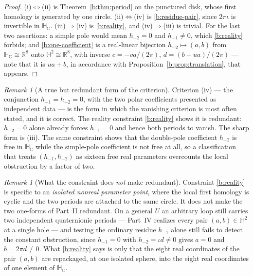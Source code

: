 \documentclass[11pt,a4paper]{article}
\numberwithin{equation}{section}
\theoremstyle{definition}
\theoremstyle{remark}
\newtheorem{remark}[theorem]{Remark}
\theoremstyle{plain}
\newcommand{\HH}{\mathbb H}
\newcommand{\HC}{\mathbb H_{\mathbb C}}
\newcommand{\RR}{\mathbb R}
\begin{document}
\begin{proof}
(i)$\Leftrightarrow$(ii) is Theorem~\ref{b:thm:period} on the punctured disk,
whose first homology is generated by one circle.  (ii)$\Leftrightarrow$(iv)
is \eqref{b:residue-pair}, since $2\pi\iota$ is invertible in $\HC$.
(iii)$\Rightarrow$(iv) is \eqref{b:reality}, and (iv)$\Rightarrow$(iii) is
trivial.  For the last two assertions: a simple pole would mean $h_{-2}=0$ and
$h_{-1}\ne0$, which \eqref{b:reality} forbids; and \eqref{b:one-coefficient}
is a real-linear bijection $h_{-2}\mapsto(a,b)$ from $\HC\cong\RR^8$ onto
$\HH^2\cong\RR^8$, with inverse $c=-va/(2\pi)$,
$d=(b+ua)/(2\pi)$ --- note that it is $ua+b$, in accordance with
Proposition~\ref{b:prop:translation}, that appears.
\end{proof}

\begin{remark}[A true but redundant form of the criterion]
\label{b:rem:redundant}
Criterion (iv) --- the conjunction $h_{-1}=h_{-2}=0$, with the two polar
coefficients presented as independent data --- is the form in which the
vanishing criterion is most often stated, and it is correct.  The reality
constraint \eqref{b:reality} shows it is redundant: $h_{-2}=0$ alone already
forces $h_{-1}=0$ and hence both periods to vanish.  The sharp form is (iii).
The same constraint shows that the double-pole coefficient $h_{-2}$ is free in
$\HC$ while the simple-pole coefficient is not free at all, so a
classification that treats $(h_{-1},h_{-2})$ as sixteen free real parameters
overcounts the local obstruction by a factor of two.
\end{remark}

\begin{remark}[What the constraint does \emph{not} make redundant]
\label{b:rem:notredundant}
Constraint \eqref{b:reality} is specific to an \emph{isolated nonreal
parameter point}, where the local first homology is cyclic and the two
periods are attached to the same circle.  It does not make the two one-forms
of Part~II redundant.  On a general $U$ an arbitrary loop still carries two
independent quaternionic periods --- Part~IV realizes every pair
$(a,b)\in\HH^2$ at a single hole --- and testing the ordinary residue
$h_{-1}$ alone still fails to detect the constant obstruction, since
$h_{-1}=0$ with $h_{-2}=\iota d\neq0$ gives $a=0$ and $b=2\pi d\ne0$.  What
\eqref{b:reality} says is only that the eight real coordinates of the pair
$(a,b)$ are repackaged, at one isolated sphere, into the eight real
coordinates of one element of $\HC$.
\end{remark}
\end{document}
